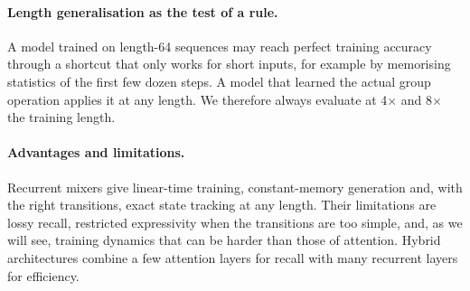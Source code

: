 \paragraph{Length generalisation as the test of a rule.} A model trained on length-64 sequences may reach
perfect training accuracy through a shortcut that only works for short inputs, for example by memorising
statistics of the first few dozen steps. A model that learned the actual group operation applies it at any
length. We therefore always evaluate at 4$\times$ and 8$\times$ the training length.

\paragraph{Advantages and limitations.} Recurrent mixers give linear-time training, constant-memory
generation and, with the right transitions, exact state tracking at any length. Their limitations are
lossy recall, restricted expressivity when the transitions are too simple, and, as we will see, training
dynamics that can be harder than those of attention. Hybrid architectures combine a few attention layers for
recall with many recurrent layers for efficiency.
